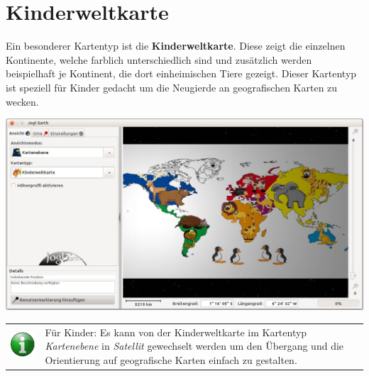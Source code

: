 \documentclass[10pt]{scrreprt}
\newcommand{\textref}[1]{\mbox{\raisebox{0.1ex}{\small$\rightarrow$ }\textit{#1}}}
\begin{document}
\vspace{5mm}
\section{Kinderweltkarte}  
Ein besonderer Kartentyp ist die \textbf{Kinderweltkarte}. Diese zeigt die einzelnen Kontinente, welche farblich unterschiedlich sind und zusätzlich werden beispielhaft je Kontinent, die dort einheimischen Tiere gezeigt. Dieser Kartentyp ist speziell für Kinder gedacht um die Neugierde an geografischen Karten zu wecken.

\vspace{3mm}
\begin{center}
\includegraphics[scale=0.25]{images/flacheKarte_Kinderweltkarte.jpg}
\end{center}

\vspace{3mm}
\begin{tabular}{>{\centering \arraybackslash}m{1cm} m{14cm}}
\includegraphics[scale=0.5]{images/info.eps} &  Für Kinder: Es kann von der Kinderweltkarte im Kartentyp \textref{Kartenebene} in \textref{Satellit} gewechselt werden um den Übergang und die Orientierung auf geografische Karten einfach zu gestalten.
\end{tabular}



\newpage
\end{document}
